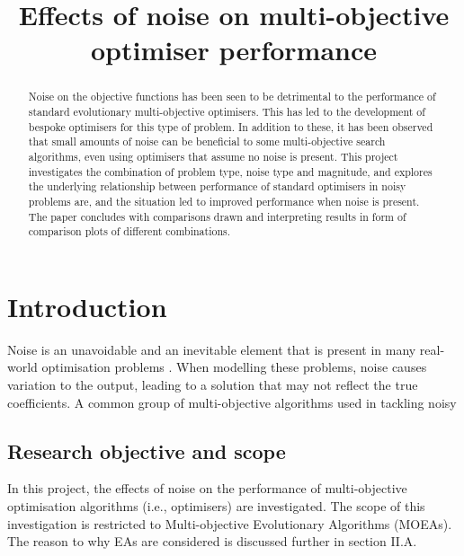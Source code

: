 \documentclass[conference,a4paper]{IEEEtran}
\begin{document}
\title{Effects of noise on multi-objective optimiser performance}

\author{       
}

\maketitle

\begin{abstract}
  Noise on the objective functions has been seen to be detrimental to the performance of standard evolutionary multi-objective optimisers. This has led to the development of bespoke optimisers for this type of problem. In addition to these, it has been observed that small amounts of noise can be beneficial to some multi-objective search algorithms, even using optimisers that assume no noise is present. This project investigates the combination of problem type, noise type and magnitude, and explores the underlying relationship between performance of standard optimisers in noisy problems are, and the situation led to improved performance when noise is present. The paper concludes with comparisons drawn and interpreting results in form of comparison plots of different combinations.
\end{abstract}


\section{Introduction}\label{sec:introduction}
Noise is an unavoidable and an inevitable element that is present in many real-world optimisation problems \cite{branke2003}. When modelling these problems, noise causes variation to the output, leading to a solution that may not reflect the true coefficients. A common group of multi-objective algorithms used in tackling noisy 

\subsection{Research objective and scope}\label{sec: oneA}
In this project, the effects of noise on the performance of multi-objective optimisation algorithms (i.e., optimisers) are investigated. The scope of this investigation is restricted to Multi-objective Evolutionary Algorithms (MOEAs). The reason to why EAs are considered is discussed further in section II.A. 
\end{document}
